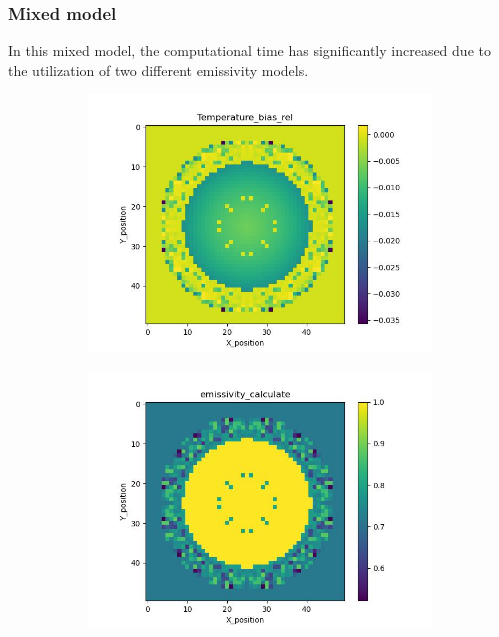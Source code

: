 \subsubsection{Mixed model}
In this mixed model, the computational time has significantly increased 
due to the utilization of two different emissivity models.

\begin{figure}[htbp]
    \centering
    \begin{minipage}{\textwidth}
        \centering
        \begin{subfigure}{0.49\textwidth}
            \centering
            \includegraphics[width=\textwidth]{figures/raw_data/0/mix/T_bias.jpg}
        \end{subfigure}
        \begin{subfigure}{0.49\textwidth}
            \centering
            \includegraphics[width=\textwidth]{figures/raw_data/0/mix/emi_cal.jpg}

\end{subfigure}
\end{minipage}
\end{figure}
